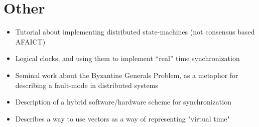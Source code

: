 \documentclass[a4paper,12pt]{article}
\begin{document}
\section{Other}

\begin{itemize}
\item \cite{Schneider90} Tutorial about implementing distributed state-machines (not consensus based AFAICT)
\item \cite{Lamport78} Logical clocks, and using them to implement ``real'' time synchronization
\item \cite{Lamport82} Seminal work about the Byzantine Generals Problem, as a metaphor for describing a fault-mode in distributed systems
\item \cite{Ramanathan90} Description of a hybrid software/hardware scheme for synchronization
\item \cite{Mattern89} Describes a way to use vectors as a way of representing "virtual time"
\end{itemize}

\printbibliography
\end{document}
